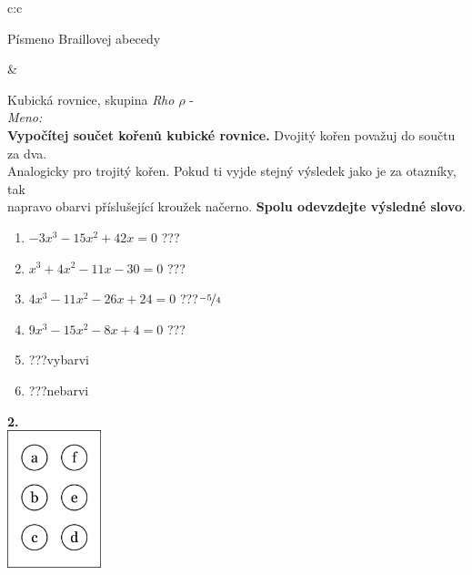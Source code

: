 \documentclass[10pt]{report}
\begin{document}
\begin{tabular}{c:c}
\begin{minipage}[c][99mm][t]{0.49\linewidth}
\begin{center}
\begin{minipage}{0.20\linewidth}
\begin{center}
{\small Písmeno Braillovej abecedy}
\end{center}
\end{minipage}
\end{center}
\end{minipage}
&
\begin{minipage}[c][99mm][t]{0.49\linewidth}
\begin{center}
\vspace{7mm}
{\huge Kubická rovnice, skupina \textit{Rho $\rho$} -}\\[4.5mm]
\textit{Meno:}\phantom{xxxxxxxxxxxxxxxxxxxxxxxxxxxxxxxxxxxxxxxxxxxxxxxxxxxxxxxxxxxxxxxxx}\\[3.5mm]
\textbf{Vypočítej součet kořenů kubické rovnice.} Dvojitý kořen považuj do součtu za dva.\\Analogicky pro trojitý kořen. Pokud ti vyjde stejný výsledek jako je za otazníky, tak\\napravo obarvi příslušející kroužek načerno. \textbf{Spolu odevzdejte výsledné slovo}.\\[3mm]
\begin{minipage}{0.77\linewidth}
\begin{center}
\begin{varwidth}{\textwidth}
\begin{enumerate}
\large
\item $-3x^3-15x^2+42x=0$\quad \dotfill\; ???\;\dotfill {}
\item $x^3+4x^2-11x-30=0$\quad \dotfill\; ???\;\dotfill {}
\item $4x^3-11x^2-26x+24=0$\quad \dotfill\; ???\;\dotfill \quad $\nicefrac{-5}{4}$
\item $9x^3-15x^2-8x+4=0$\quad \dotfill\; ???\;\dotfill {}
\item \quad \dotfill\; ???\;\dotfill \quad vybarvi
\item \quad \dotfill\; ???\;\dotfill \quad nebarvi
\end{enumerate}
\end{varwidth}
\end{center}
\end{minipage}
\begin{minipage}{0.20\linewidth}
\begin{center}
{\Huge\bfseries 2.} \\[2mm]
\includegraphics[height=40mm]{../images/braille.png}

\end{center}
\end{minipage}
\end{center}
\end{minipage}
\end{tabular}
\end{document}
